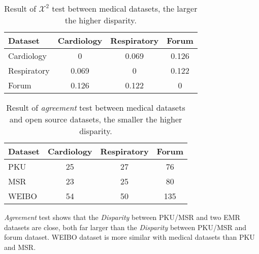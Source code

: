 \begin{table}[th]
\small
\centering
\caption{Result of $\mathcal{X}^2$ test between medical datasets, the larger the higher disparity.}\label{table:x2test}
\begin{adjustbox}{width=7.7cm}
\begin{tabular}{lccc}
\hline
Dataset & Cardiology & Respiratory & Forum\\
\hline
Cardiology & 0 & 0.069 & 0.126\\
Respiratory & 0.069 & 0 & 0.122\\
Forum & 0.126 & 0.122 & 0\\
\hline
\end{tabular}
\end{adjustbox}
\end{table}

\begin{table}[th]
\centering
\small
\caption{Result of \textit{agreement} test between medical datasets and open source datasets, the smaller the higher disparity.}\label{table:simpletest}
\begin{tabular}{lccc}
\hline
Dataset & Cardiology & Respiratory & Forum\\
\hline
PKU & 25 & 27 & 76\\
MSR & 23 & 25 & 80\\
WEIBO & 54 & 50 & 135\\
\hline
\end{tabular}
\end{table}



\textit{Agreement} test shows that the \textit{Disparity} between PKU/MSR and two EMR datasets are close, both far larger than the \textit{Disparity} between PKU/MSR and forum dataset. WEIBO dataset is more similar with medical datasets than PKU and MSR.

